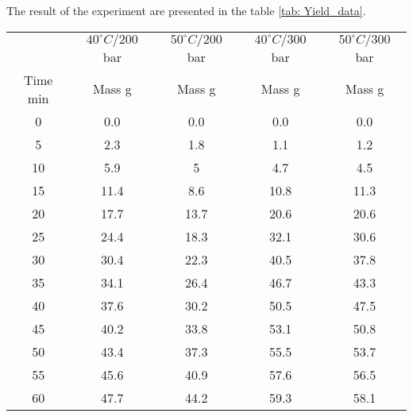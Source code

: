 \documentclass[../Article_Model_Parameters.tex]{subfiles}
\begin{document}
	The result of the experiment are presented in the table \ref{tab: Yield_data}.
	
	\begin{table}[H]
		\centering
		\begin{tabular}{c|cccc}
			& $40 ^\circ C / 200$ bar & $50 ^\circ C / 200$ bar & $40 ^\circ C / 300$ bar & $50 ^\circ C / 300$ bar \\ 
			Time min & Mass g                  & Mass g                  & Mass g                  & Mass g                  \\ \hline
			0        & 0.0                     & 0.0                     & 0.0                     & 0.0                     \\
			5        & 2.3                     & 1.8                     & 1.1                     & 1.2                     \\
			10       & 5.9                     & 5                       & 4.7                     & 4.5                     \\
			15       & 11.4                    & 8.6                     & 10.8                    & 11.3                    \\
			20       & 17.7                    & 13.7                    & 20.6                    & 20.6                    \\
			25       & 24.4                    & 18.3                    & 32.1                    & 30.6                    \\
			30       & 30.4                    & 22.3                    & 40.5                    & 37.8                    \\
			35       & 34.1                    & 26.4                    & 46.7                    & 43.3                    \\
			40       & 37.6                    & 30.2                    & 50.5                    & 47.5                    \\
			45       & 40.2                    & 33.8                    & 53.1                    & 50.8                    \\
			50       & 43.4                    & 37.3                    & 55.5                    & 53.7                    \\
			55       & 45.6                    & 40.9                    & 57.6                    & 56.5                    \\
			60       & 47.7                    & 44.2                    & 59.3                    & 58.1                    \\

\end{tabular}
\end{table}
\end{document}
